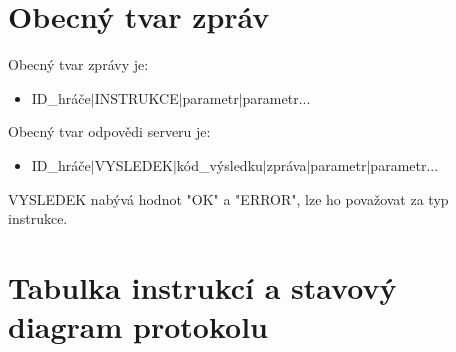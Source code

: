 \documentclass[12pt]{report}
\begin{document}
\section{Obecný tvar zpráv}
Obecný tvar zprávy je:
\begin{itemize}
	\item ID\_hráče$|$INSTRUKCE$|$parametr$|$parametr...
\end{itemize}

\noindent Obecný tvar odpovědi serveru je: 

\begin{itemize}
	\item ID\_hráče$|$VYSLEDEK$|$kód\_výsledku$|$zpráva$|$parametr$|$parametr...
\end{itemize}


\noindent VYSLEDEK nabývá hodnot "OK" a "ERROR", lze ho považovat za typ instrukce.
%
%
\section{Tabulka instrukcí a stavový diagram protokolu}
\end{document}
